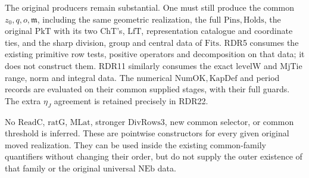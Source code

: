The original producers remain substantial.  One must still produce
the common \(z_0,q,o,\mathfrak m\), including the same geometric
realization, the full \(\mathrm{Pins,Holds}\), the original
\(\mathrm{PkT}\) with its two \(\mathrm{ChT}\)'s,
\(\mathrm{LfT}\), representation catalogue and coordinate ties,
and the sharp division, group and central data of
\(\mathrm{Fits}\).  RDR5 consumes the existing primitive row tests,
positive operators and decomposition on that data; it does not
construct them.  RDR11 similarly consumes the exact
\(\mathrm{levelW}\) and \(\mathrm{MjTie}\) range, norm and integral
data.  The numerical \(\mathrm{NumOK,KapDef}\) and period records
are evaluated on their common supplied stages, with their full guards.
The extra \(\eta_J\) agreement is retained precisely in RDR22.

No \(\mathrm{ReadC}\), \(\mathrm{ratG}\), \(\mathrm{MLat}\),
stronger \(\mathrm{DivRows3}\), new common selector, or common
threshold is inferred.  These are pointwise constructors for every
given original moved realization.  They can be used inside the
existing common-family quantifiers without changing their order,
but do not supply the outer existence of that family or the
original universal \(\mathrm{NEb}\) data.
